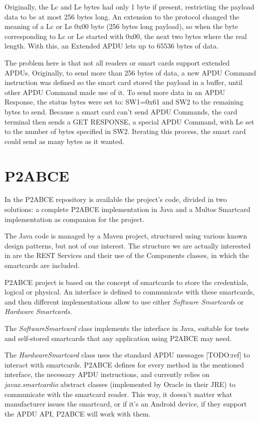 Originally, the Lc and Le bytes had only 1 byte if present, restricting the payload data to be at most 256 bytes long. An extension to the protocol changed the meaning of a Lc or Le 0x00 byte (256 bytes long payload), so when the byte corresponding to Lc or Le started with 0x00, the next two bytes where the real length.  With this, an Extended APDU lets up to 65536 bytes of data.

The problem here is that not all readers or smart cards support extended APDUs. Originally, to send more than 256 bytes of data, a new APDU Command instruction was defined so the smart card stored the payload in a buffer, until other APDU Command made use of it. To send more data in an APDU Response, the status bytes were set to: SW1=0x61 and SW2 to the remaining bytes to send. Because a smart card can't send APDU Commands, the card terminal then sends a GET RESPONSE, a special APDU Command, with Le set to the number of bytes specified in SW2. Iterating this process, the smart card could send as many bytes as it wanted.






\section{P2ABCE}


In the \ac{P2ABCE} repository \citep{p2abcurl} is available the project's code, divided in two solutions: a complete P2ABCE implementation in Java and a Multos Smartcard implementation as companion for the project.

The Java code is managed by a Maven project, structured using various known design patterns, but not of our interest. The structure we are actually interested in are the REST Services and their use of the Components classes, in which the smartcards are included.

P2ABCE project is based on the concept of smartcards to store the credentials, logical or physical. An interface is defined to communicate with these smartcards, and then different implementations allow to use either \textit{Software Smartcards} or \textit{Hardware Smartcards}. 

The \textit{SoftwareSmartcard} class implements the interface in Java, suitable for tests and self-stored smartcards that any application using P2ABCE may need.

The \textit{HardwareSmartcard} class uses the standard APDU messages [TODO:ref] to interact with smartcards. P2ABCE defines for every method in the mentioned interface, the necessary APDU instructions, and currently relies on \textit{javax.smartcardio} abstract classes (implemented by Oracle in their JRE) to communicate with the smartcard reader. This way, it doesn't matter what manufacturer issues the smartcard, or if it's an Android device, if they support the APDU API, P2ABCE will work with them.

